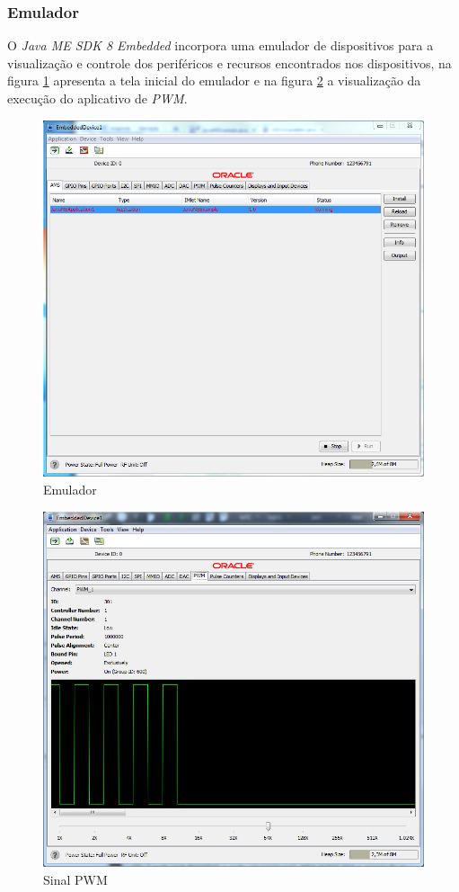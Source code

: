 \subsubsection{Emulador}

O \textit{Java ME SDK 8 Embedded} incorpora uma emulador de dispositivos para a 
visualização e controle dos periféricos e recursos encontrados nos 
dispositivos, na figura \ref{fig:java-me/emulator} apresenta a tela inicial do 
emulador e na figura \ref{fig:java-me/pwm} a visualização da execução do 
aplicativo de \textit{PWM}.

\begin{figure}[H]
    \centering
    \includegraphics[width=0.7\linewidth]{figuras/java/java-me-emulator.png}
    \caption{Emulador}
    \label{fig:java-me/emulator}
\end{figure}

\begin{figure}[H]
    \centering
    \includegraphics[width=0.7\linewidth]{figuras/java/java-me-pwm.png}
    \caption{Sinal PWM}
    \label{fig:java-me/pwm}
\end{figure}

